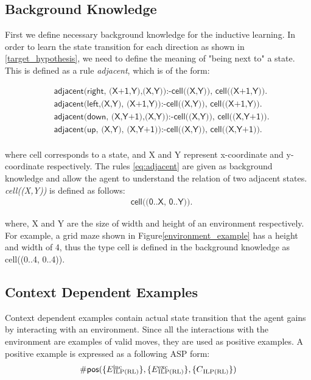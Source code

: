 \subsection{Background Knowledge}
\label{subsec:background_knowledge}
First we define necessary background knowledge for the inductive learning.
In order to learn the state transition for each direction as shown in \ref{target_hypothesis}, we need to define the meaning of "being next to" a state.
This is defined as a rule \textit{adjacent}, which is of the form:

\begin{equation} \label{eq:adjacent}
\begin{split}
&\textsf{adjacent(right, (X+1,Y),(X,Y)):-cell((X,Y)), cell((X+1,Y)).} \\
&\textsf{adjacent(left,(X,Y),  (X+1,Y)):-cell((X,Y)), cell((X+1,Y)).} \\
&\textsf{adjacent(down, (X,Y+1),(X,Y)):-cell((X,Y)), cell((X,Y+1)).} \\
&\textsf{adjacent(up,   (X,Y),  (X,Y+1)):-cell((X,Y)), cell((X,Y+1)).} \\
\end{split}
\end{equation}

where \textsf{cell} corresponds to a state, and \textsf{X} and \textsf{Y} represent x-coordinate and y-coordinate respectively.
The rules \ref{eq:adjacent} are given as background knowledge and allow the agent to understand the relation of two adjacent states.
\textit{cell((X,Y))} is defined as follows:
\begin{equation} \label{eq:cell}
\begin{split}
    &\textsf{cell((0..X, 0..Y)).}
\end{split}
\end{equation}

where, \textsf{X} and \textsf{Y} are the size of width and height of an environment respectively. 
For example, a grid maze shown in Figure\ref{environment_example} has a height and width of 4, thus the type cell is defined in the background knowledge as \textsf{cell((0..4, 0..4))}.

\subsection{Context Dependent Examples}
Context dependent examples contain actual state transition that the agent gains by interacting with an environment. Since all the interactions with the environment are examples of valid moves,
they are used as positive examples. A positive example is expressed as a following ASP form:
\begin{equation}
\begin{split}
    \textsf{\#pos}(\{E\SPSB{inc}{ILP(RL)}\}, \{E\SPSB{exc}{ILP(RL)}\}, \{C\textsubscript{ILP(RL)}\})
\end{split}
\end{equation}

